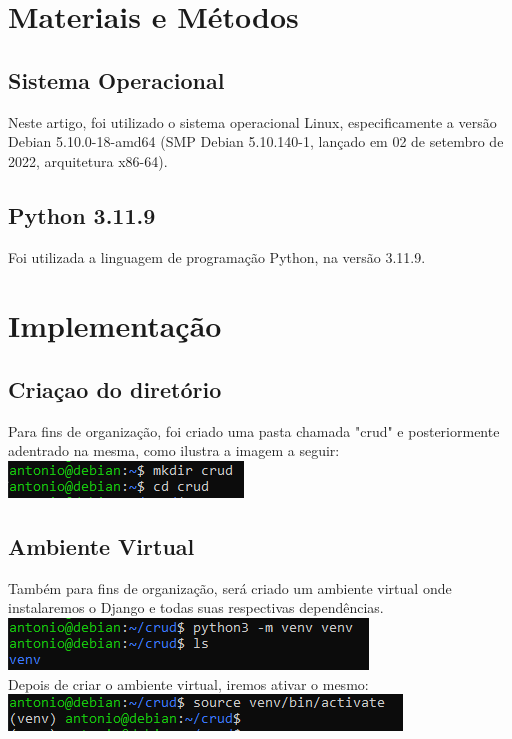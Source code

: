 \documentclass[11pt]{article} %
\begin{document}
\maketitle
\section{Materiais e Métodos}
\subsection{Sistema Operacional}
Neste artigo, foi utilizado o sistema operacional Linux, especificamente a versão Debian 5.10.0-18-amd64 (SMP Debian 5.10.140-1, lançado em 02 de setembro de 2022, arquitetura x86-64).
\subsection{Python 3.11.9}
Foi utilizada a linguagem de programação Python, na versão 3.11.9.


\maketitle
\section{Implementação}
\subsection{Criaçao do diretório}
Para fins de organização, foi criado uma pasta chamada "crud" e posteriormente adentrado na mesma, como ilustra a imagem a seguir:\\
\includegraphics[]{images/s1.PNG}
\subsection{Ambiente Virtual}
Também para fins de organização, será criado um ambiente virtual onde instalaremos o Django e todas suas respectivas dependências.\\
\includegraphics[]{images/s2.PNG}\\
Depois de criar o ambiente virtual, iremos ativar o mesmo:\\
\includegraphics[]{images/s3.PNG}
\end{document}
